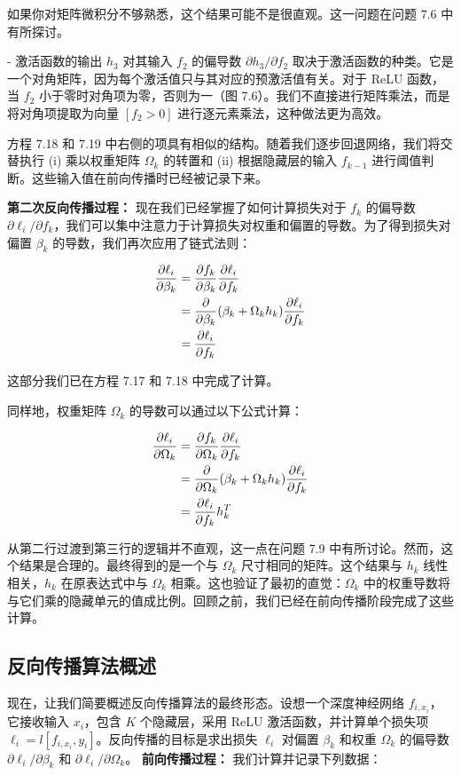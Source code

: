 如果你对矩阵微积分不够熟悉，这个结果可能不是很直观。这一问题在问题 7.6 中有所探讨。

- 激活函数的输出 \(h_3\) 对其输入 \(f_2\) 的偏导数 \(\partial h_3/\partial f_2\) 取决于激活函数的种类。它是一个对角矩阵，因为每个激活值只与其对应的预激活值有关。对于 ReLU 函数，当 \(f_2\) 小于零时对角项为零，否则为一（图 7.6）。我们不直接进行矩阵乘法，而是将对角项提取为向量 \([f_2 > 0]\) 进行逐元素乘法，这种做法更为高效。

方程 7.18 和 7.19 中右侧的项具有相似的结构。随着我们逐步回退网络，我们将交替执行 (i) 乘以权重矩阵 \(\Omega_k\) 的转置和 (ii) 根据隐藏层的输入 \(f_{k-1}\) 进行阈值判断。这些输入值在前向传播时已经被记录下来。


\textbf{第二次反向传播过程：} 现在我们已经掌握了如何计算损失对于 \(f_k\) 的偏导数 \(\partial \ell_i/\partial f_k\)，我们可以集中注意力于计算损失对权重和偏置的导数。为了得到损失对偏置 \(\beta_k\) 的导数，我们再次应用了链式法则：


\begin{align}
\frac{\partial \ell_i}{\partial \beta_k} &= \frac{\partial f_k}{\partial \beta_k} \frac{\partial \ell_i}{\partial f_k} \notag \\
&= \frac{\partial}{\partial \beta_k} (\beta_k + \Omega_k h_k) \frac{\partial \ell_i}{\partial f_k} \notag \\
&= \frac{\partial \ell_i}{\partial f_k} 
\end{align}


这部分我们已在方程 7.17 和 7.18 中完成了计算。

同样地，权重矩阵 \(\Omega_k\) 的导数可以通过以下公式计算：


\begin{align}
\frac{\partial \ell_i}{\partial \Omega_k} &= \frac{\partial f_k}{\partial \Omega_k} \frac{\partial \ell_i}{\partial f_k} \notag \\
&= \frac{\partial}{\partial \Omega_k} (\beta_k + \Omega_k h_k) \frac{\partial \ell_i}{\partial f_k} \notag \\
&= \frac{\partial \ell_i}{\partial f_k} h_k^T 
\end{align}


从第二行过渡到第三行的逻辑并不直观，这一点在问题 7.9 中有所讨论。然而，这个结果是合理的。最终得到的是一个与 \(\Omega_k\) 尺寸相同的矩阵。这个结果与 \(h_k\) 线性相关，\(h_k\) 在原表达式中与 \(\Omega_k\) 相乘。这也验证了最初的直觉：\(\Omega_k\) 中的权重导数将与它们乘的隐藏单元的值成比例。回顾之前，我们已经在前向传播阶段完成了这些计算。
\subsection{反向传播算法概述 }
现在，让我们简要概述反向传播算法的最终形态。设想一个深度神经网络 \(f_{i,x_i}\)，它接收输入 \(x_i\)，包含 \(K\) 个隐藏层，采用 ReLU 激活函数，并计算单个损失项 \(\ell_i = l[f_{i,x_i}, y_i]\)。反向传播的目标是求出损失 \(\ell_i\) 对偏置 \(\beta_k\) 和权重 \(\Omega_k\) 的偏导数 \(\partial \ell_i/\partial \beta_k\) 和 \(\partial \ell_i/\partial \Omega_k\)。 \textbf{前向传播过程：} 我们计算并记录下列数据：


